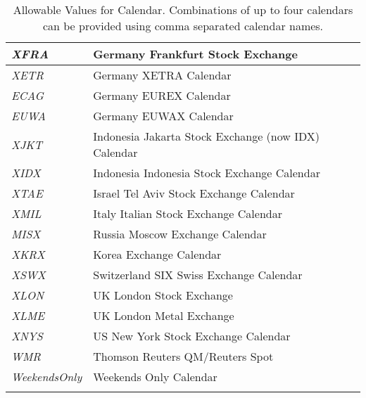 \begin{longtable}{| p{} | p{} |}
    \emph{XFRA} & Germany Frankfurt Stock Exchange \\ \hline
    \emph{XETR} & Germany XETRA Calendar \\ \hline
    \emph{ECAG} & Germany EUREX Calendar \\ \hline
    \emph{EUWA} & Germany EUWAX Calendar \\ \hline
    \emph{XJKT} & Indonesia Jakarta Stock Exchange (now IDX) Calendar \\ \hline
    \emph{XIDX} & Indonesia Indonesia Stock Exchange Calendar \\ \hline
    \emph{XTAE} & Israel Tel Aviv Stock Exchange Calendar \\ \hline
    \emph{XMIL} & Italy Italian Stock Exchange Calendar \\ \hline
    \emph{MISX} & Russia Moscow Exchange Calendar \\ \hline
    \emph{XKRX} & Korea Exchange Calendar \\ \hline
    \emph{XSWX} & Switzerland SIX Swiss Exchange Calendar \\ \hline
    \emph{XLON} & UK London Stock Exchange \\ \hline
    \emph{XLME} & UK London Metal Exchange \\ \hline
    \emph{XNYS} & US New York Stock Exchange Calendar \\ \hline
    \emph{WMR} & Thomson Reuters QM/Reuters Spot \\ \hline
    \emph{WeekendsOnly} & Weekends Only Calendar \\ \hline
  \caption{Allowable Values for Calendar. Combinations of up to four
    calendars can be provided using comma separated calendar names.}
  \label{tab:calendar}
\end{longtable}

